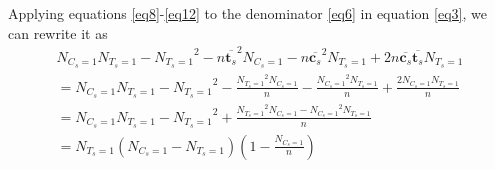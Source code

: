Applying equations \eqref{eq8}-\eqref{eq12} to the denominator \eqref{eq6} in equation \eqref{eq3}, 
we can rewrite it as
\begin{equation}\label{eq14}
\begin{array}{l}
N_{C_s=1}N_{T_s=1}-{N_{T_s=1}}^2
-n{{\overline {\mathbf{t}_s}} ^2} N_{C_s=1}
-n{{\overline{\mathbf{c}_s}}^2}N_{T_s=1}
+2n{\overline{\mathbf{c}_s}}{\overline{\mathbf{t}_s}}N_{T_s=1}\\
=N_{C_s=1}N_{T_s=1}-{N_{T_s=1}}^2
-\frac{{{N_{T_s=1}}^2}{N_{C_s=1}}}{n}
-\frac{{{N_{C_s=1}}^2}{N_{T_s=1}}}{n}
+\frac{2N_{C_s=1}N_{T_s=1}}{n}\\
=N_{C_s=1}N_{T_s=1}-{N_{T_s=1}}^2+\frac{{{N_{T_s=1}}^2}{N_{C_s=1}}-{{N_{C_s=1}}^2}{N_{T_s=1}}}{n}\\
=N_{T_s=1}(N_{C_s=1}-N_{T_s=1})(1-\frac{N_{C_s=1}}{n})
\end{array}
\end{equation}

